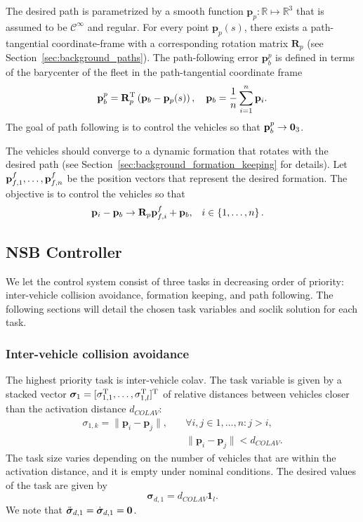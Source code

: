 The desired path is parametrized by a smooth function $\mathbf{p}_p : \mathbb{R} \mapsto \mathbb{R}^3$ that is assumed to be $\mathcal{C}^\infty$ and regular.
For every point $\mathbf{p}_p(s)$, there exists a path-tangential coordinate-frame with a corresponding rotation matrix $\mathbf{R}_p$ (see Section~\ref{sec:background_paths}). 
The path-following error $\mathbf{p}_b^p$ is defined in terms of the barycenter of the fleet in the path-tangential coordinate frame
\begin{equation}
    \mathbf{p}_b^p = \mathbf{R}_p^{\mathrm{T}}\left(\mathbf{p}_b - \mathbf{p}_p(s)\right), \quad \mathbf{p}_b = \frac{1}{n}\sum_{i=1}^n \mathbf{p}_i.
\end{equation}
The goal of path following is to control the vehicles so that $\mathbf{p}_b^p \rightarrow \mathbf{0}_3$.

The vehicles should converge to a dynamic formation that rotates with the desired path (see Section~\ref{sec:background_formation_keeping} for details).
Let $\mathbf{p}_{f,1}^f, \ldots, \mathbf{p}_{f,n}^f$ be the position vectors that represent the desired formation.
The objective is to control the vehicles so that
\begin{align}
    \mathbf{p}_i - \mathbf{p}_b &\rightarrow \mathbf{R}_p \mathbf{p}_{f,i}^f + \mathbf{p}_b, &
    i &\in \left\{1, \ldots, n \right\}.
\end{align}

\subsection{NSB Controller}\label{sec:NSB_case_study}

We let the control system consist of three tasks in decreasing order of priority: inter-vehicle collision avoidance, formation keeping, and path following. The following sections will detail the chosen task variables and \gls{soclik} solution for each task.

\subsubsection{Inter-vehicle collision avoidance}

The highest priority task is inter-vehicle \acrfull{colav}. The task variable is given by a stacked vector $\bm{\sigma}_1 = [\sigma_{1,1}^{\mathrm{T}}, \ldots, \sigma_{1,l}^{\mathrm{T}}]^{\mathrm{T}}$ of relative distances between vehicles closer than the activation distance $d_{COLAV}$:
\begin{equation}
\begin{split}
    \sigma_{1,k} = \|\mathbf{p}_i - \mathbf{p}_j\|, \quad &\forall i,j \in {1, \ldots, n}: j > i,\\
    &\|\mathbf{p}_i - \mathbf{p}_j\| < d_{COLAV}.
    \end{split}
\end{equation}
The task size varies depending on the number of vehicles that are within the activation distance, and it is empty under nominal conditions. The desired values of the task are given by
\begin{equation}
    \bm{\sigma}_{d,1} = d_{COLAV} \mathbf{1}_l.
\end{equation}
We note that $\ddot{\bm{\sigma}}_{d,1} = \dot{\bm{\sigma}}_{d,1}= \mathbf{0}$.

